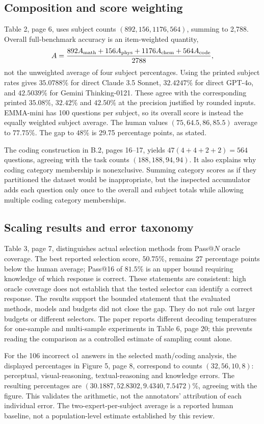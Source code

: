 \documentclass[10pt]{article}
\begin{document}
\subsection*{Composition and score weighting}
Table 2, page 6, uses subject counts \((892,156,1176,564)\), summing to 2,788. Overall full-benchmark accuracy is an item-weighted quantity, \[A=\frac{892A_{\rm math}+156A_{\rm phys}+1176A_{\rm chem}
                 +564A_{\rm code}}{2788},\] not the unweighted average of four subject percentages. Using the printed subject rates gives \(35.0788\%\) for direct Claude 3.5 Sonnet, \(32.4247\%\) for direct GPT-4o, and \(42.5039\%\) for Gemini Thinking-0121. These agree with the corresponding printed \(35.08\%\), \(32.42\%\) and \(42.50\%\) at the precision justified by rounded inputs. EMMA-mini has 100 questions per subject, so its overall score is instead the equally weighted subject average. The human values \((75,64.5,86,85.5)\) average to \(77.75\%\). The gap to \(48\%\) is 29.75 percentage points, as stated.\par
The coding construction in B.2, pages 16–17, yields \(47(4+4+2+2)=564\) questions, agreeing with the task counts \((188,188,94,94)\). It also explains why coding category membership is nonexclusive. Summing category scores as if they partitioned the dataset would be inappropriate, but the inspected accumulator adds each question only once to the overall and subject totals while allowing multiple coding category memberships.\par
\subsection*{Scaling results and error taxonomy}
Table 3, page 7, distinguishes actual selection methods from Pass@\(N\) oracle coverage. The best reported selection score, \(50.75\%\), remains 27 percentage points below the human average; Pass@16 of \(81.5\%\) is an upper bound requiring knowledge of which response is correct. These statements are consistent: high oracle coverage does not establish that the tested selector can identify a correct response. The results support the bounded statement that the evaluated methods, models and budgets did not close the gap. They do not rule out larger budgets or different selectors. The paper reports different decoding temperatures for one-sample and multi-sample experiments in Table 6, page 20; this prevents reading the comparison as a controlled estimate of sampling count alone.\par
For the 106 incorrect o1 answers in the selected math/coding analysis, the displayed percentages in Figure 5, page 8, correspond to counts \((32,56,10,8)\): perceptual, visual-reasoning, textual-reasoning and knowledge errors. The resulting percentages are \((30.1887,52.8302,9.4340,7.5472)\%\), agreeing with the figure. This validates the arithmetic, not the annotators’ attribution of each individual error. The two-expert-per-subject average is a reported human baseline, not a population-level estimate established by this review.\par
\end{document}
